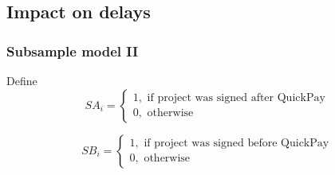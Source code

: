 \documentclass[
]{article}
\begin{document}
\hypertarget{impact-on-delays}{%
\subsection{Impact on delays}\label{impact-on-delays}}

\hypertarget{subsample-model-ii}{%
\subsubsection{Subsample model II}\label{subsample-model-ii}}

Define
\[ SA_i = \begin{cases} 1, \text{ if project was signed after QuickPay}\\
0, \text{ otherwise} \end{cases}\]

\[ SB_i = \begin{cases} 1, \text{ if project was signed before QuickPay}\\
0, \text{ otherwise} \end{cases}\]
\end{document}
